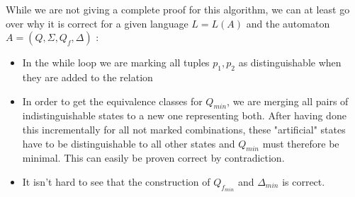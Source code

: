 \documentclass{llncs}
\begin{document}
While we are not giving a complete proof for this algorithm, we can at least go over why it is correct for a given language \(L = L(A)\) and the automaton \(A = (Q, \Sigma, Q_f, \Delta) \) \cite{tata-nfta}:
\begin{itemize}
	\item In the while loop we are marking all tuples \(p_1, p_2\) as distinguishable when they are added to the relation
	\\
	\item In order to get the equivalence classes for \(Q_{min}\), we are merging all pairs of indistinguishable states to a new one representing both. After having done this incrementally for all not marked combinations, these "artificial" states have to be distinguishable to all other states and \(Q_{min}\) must therefore be minimal. This can easily be proven correct by contradiction.
	\\
	\item It isn't hard to see that the construction of \(Q_{f_{min}}\) and \(\Delta_{min} \) is correct.
\end{itemize}
\end{document}
